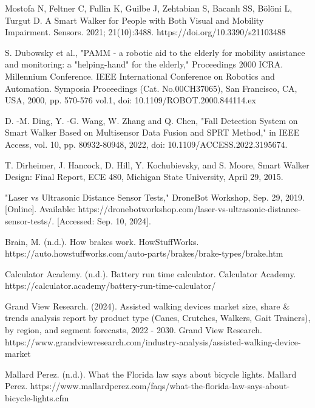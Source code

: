 \begin{thebibliography}{45}
	
	 Mostofa N, Feltner C, Fullin K, Guilbe J, Zehtabian S, Bacanlı SS, Bölöni L, Turgut D. A Smart Walker for People with Both Visual and Mobility Impairment. Sensors. 2021; 21(10):3488. https://doi.org/10.3390/s21103488
	
	 S. Dubowsky et al., "PAMM - a robotic aid to the elderly for mobility assistance and monitoring: a "helping-hand" for the elderly," Proceedings 2000 ICRA. Millennium Conference. IEEE International Conference on Robotics and Automation. Symposia Proceedings (Cat. No.00CH37065), San Francisco, CA, USA, 2000, pp. 570-576 vol.1, doi: 10.1109/ROBOT.2000.844114.ex
	
	 D. -M. Ding, Y. -G. Wang, W. Zhang and Q. Chen, "Fall Detection System on Smart Walker Based on Multisensor Data Fusion and SPRT Method," in IEEE Access, vol. 10, pp. 80932-80948, 2022, doi: 10.1109/ACCESS.2022.3195674.
	
	 T. Dirheimer, J. Hancock, D. Hill, Y. Kochubievsky, and S. Moore, Smart Walker Design: Final Report, ECE 480, Michigan State University, April 29, 2015.
	
	 "Laser vs Ultrasonic Distance Sensor Tests," DroneBot Workshop, Sep. 29, 2019. [Online]. Available: https://dronebotworkshop.com/laser-vs-ultrasonic-distance-sensor-tests/. [Accessed: Sep. 10, 2024].

	 Brain, M. (n.d.). How brakes work. HowStuffWorks. https://auto.howstuffworks.com/auto-parts/brakes/brake-types/brake.htm
	
	 Calculator Academy. (n.d.). Battery run time calculator. Calculator Academy. https://calculator.academy/battery-run-time-calculator/ 
	
	 Grand View Research. (2024). Assisted walking devices market size, share \& trends analysis report by product type (Canes, Crutches, Walkers, Gait Trainers), by region, and segment forecasts, 2022 - 2030. Grand View Research. https://www.grandviewresearch.com/industry-analysis/assisted-walking-device-market
	
	 Mallard Perez. (n.d.). What the Florida law says about bicycle lights. Mallard Perez. https://www.mallardperez.com/faqs/what-the-florida-law-says-about-bicycle-lights.cfm 
	
\end{thebibliography}
